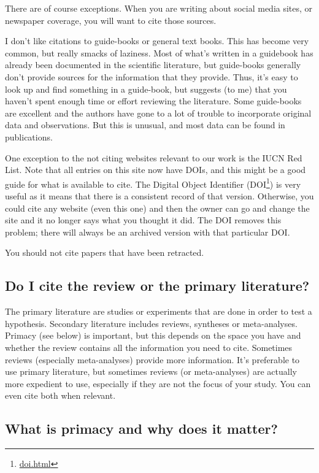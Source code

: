\documentclass[
]{krantz}
\renewcommand{\href}[2]{#2\footnote{\url{#1}}}
\begin{document}
There are of course exceptions. When you are writing about social media sites, or newspaper coverage, you will want to cite those sources.

I don't like citations to guide-books or general text books. This has become very common, but really smacks of laziness. Most of what's written in a guidebook has already been documented in the scientific literature, but guide-books generally don't provide sources for the information that they provide. Thus, it's easy to look up and find something in a guide-book, but suggests (to me) that you haven't spent enough time or effort reviewing the literature. Some guide-books are excellent and the authors have gone to a lot of trouble to incorporate original data and observations. But this is unusual, and most data can be found in publications.

One exception to the not citing websites relevant to our work is the IUCN Red List. Note that all entries on this site now have DOIs, and this might be a good guide for what is available to cite. The Digital Object Identifier (\href{doi.html}{DOI}) is very useful as it means that there is a consistent record of that version. Otherwise, you could cite any website (even this one) and then the owner can go and change the site and it no longer says what you thought it did. The DOI removes this problem; there will always be an archived version with that particular DOI.

You should not cite papers that have been retracted.

\hypertarget{do-i-cite-the-review-or-the-primary-literature}{%
\subsection{Do I cite the review or the primary literature?}\label{do-i-cite-the-review-or-the-primary-literature}}

The primary literature are studies or experiments that are done in order to test a hypothesis. Secondary literature includes reviews, syntheses or meta-analyses. Primacy (see below) is important, but this depends on the space you have and whether the review contains all the information you need to cite. Sometimes reviews (especially meta-analyses) provide more information. It's preferable to use primary literature, but sometimes reviews (or meta-analyses) are actually more expedient to use, especially if they are not the focus of your study. You can even cite both when relevant.

\hypertarget{what-is-primacy-and-why-does-it-matter}{%
\subsection{What is primacy and why does it matter?}\label{what-is-primacy-and-why-does-it-matter}}
\end{document}
